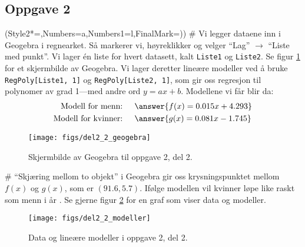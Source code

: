\subsection*{Oppgave 2}
\begin{easylist}[enumerate]
	\ListProperties(Style2*=,Numbers=a,Numbers1=l,FinalMark={)})
	# Vi legger dataene inn i Geogebra i regnearket. Så markerer vi, høyreklikker og velger ``Lag'' $\rightarrow$ ``Liste med punkt''. Vi lager én liste for hvert datasett, kalt \texttt{Liste1} og \texttt{Liste2}. Se figur \ref{fig:del22geogebra} for et skjermbilde av Geogebra.
	Vi lager deretter lineære modeller ved å bruke  \texttt{RegPoly[Liste1, 1]} og \texttt{RegPoly[Liste2, 1]}, som gir oss regresjon til polynomer av grad 1---med andre ord $y = ax+b$.
	Modellene vi får blir da:
	\begin{align*}
		\text{Modell for menn: }& \quad  \answer{f(x) = 0.015x + 4.293} \\
		\text{Modell for kvinner: }& \quad  \answer{g(x) = 0.081x - 1.745}
	\end{align*}
	
	\begin{figure}[th!]
		\centering
		\texttt{[image: figs/del2\_2\_geogebra]}
		\caption{Skjermbilde av Geogebra til oppgave 2, del 2.}
		\label{fig:del22geogebra}
	\end{figure}
	
	
	# ``Skjæring mellom to objekt'' i Geogebra gir oss krysningspunktet mellom $f(x)$ og $g(x)$, som er $(91.6, 5.7)$.
	Ifølge modellen vil kvinner løpe like raskt som menn i år .
	Se gjerne figur \ref{fig:del22modeller} for en graf som viser data og modeller.
	
	
	\begin{figure}[th!]
		\centering
		\texttt{[image: figs/del2\_2\_modeller]}
		\caption{Data og lineære modeller i oppgave 2, del 2.}
		\label{fig:del22modeller}
	\end{figure}
	

\end{easylist}
